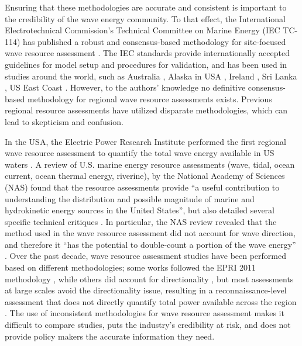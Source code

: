 Ensuring that these methodologies are accurate and consistent is important to the credibility of the wave energy community. To that effect, the International Electrotechnical Commission's Technical Committee on Marine Energy (IEC TC-114) has published a robust and consensus-based methodology for site-focused wave resource assessment \citep[][hereafter, 62600-101]{internationalelectrotechnicalcommissionPart101Wave2015}. The IEC standards provide internationally accepted guidelines for model setup and procedures for validation, and has been used in studies around the world, such as Australia \citep{hemerRevisedAssessmentAustralia2017}, Alaska in USA \citep{garciamedinaWaveResourceCharacterization2021}, Ireland \citep{ramosExploringUtilityEffectiveness2016}, Sri Lanka \citep{lokuliyanaSriLankanWave2020}, US East Coast \citep{ahnNearshoreWaveEnergy2021}. However, to the authors’ knowledge no definitive consensus-based methodology for regional wave resource assessments exists. Previous regional resource assessments have utilized disparate methodologies, which can lead to skepticism and confusion. 

In the USA, the Electric Power Research Institute performed the first regional wave resource assessment to quantify the total wave energy available in US waters \citep[][hereafter, EPRI 2011]{EPRIwaveresource2011}. A review of U.S. marine energy resource assessments (wave, tidal, ocean current, ocean thermal energy, riverine), by the National Academy of Sciences (NAS) found that the resource assessments provide “a useful contribution to understanding the distribution and possible magnitude of marine and hydrokinetic energy sources in the United States”, but also detailed several specific technical critiques \citep{nationalresearchcouncilEvaluationDepartmentEnergy2013}. In particular, the NAS review revealed that the method used in the wave resource assessment did not account for wave direction, and therefore it “has the potential to double-count a portion of the wave energy” \citep{nationalresearchcouncilEvaluationDepartmentEnergy2013}. Over the past decade, wave resource assessment studies have been performed based on different methodologies; some works followed the EPRI 2011 methodology \citep[e.g., ][]{kumarWaveEnergyResource2015}, while others did account for directionality \citep{gunnQuantifyingGlobalWave2012, garcia-medinaWaveResourceAssessment2014, regueroGlobalWavePower2015}, but most assessments at large scales avoid the directionality issue, resulting in a reconnaissance-level assessment that does not directly quantify total power available across the region \citep{iglesiasWaveEnergyPotential2009, neillWavePowerVariability2013, sierraWaveEnergyResource2013, robertsonCharacterizingShoreWave2014, alonsoWaveEnergyResource2015, zhengAssessingChinaSea2013}. The use of inconsistent methodologies for wave resource assessment makes it difficult to compare studies, puts the industry’s credibility at risk, and does not provide policy makers the accurate information they need.

